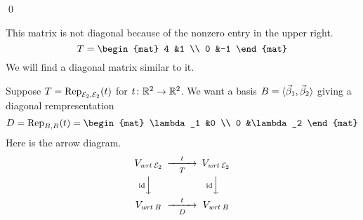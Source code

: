 \documentclass[10pt,t]{beamer}
\begin{document}
\begin{frame}
\lm[lm:DiagIffBasisOfEigens]

\pause
\pf
{}  
\qed
\end{frame}

\begin{frame}
\ex
This matrix is not diagonal because of the nonzero entry in the upper right.
\begin{equation*}
  T=
  \begin{mat}
    4  &1  \\
    0  &-1
  \end{mat}
\end{equation*}
We will find a diagonal matrix similar to it.

\pause
Suppose $T=\rep{t}{\stdbasis_2,\stdbasis_2}$ for $\map{t}{\Re^2}{\Re^2}$.
We want a basis $B=\sequence{\vec{\beta}_1,\vec{\beta}_2}$ giving a 
diagonal rempresentation
\begin{equation*}
  D=\rep{t}{B,B}=
  \begin{mat}
    \lambda_1  &0 \\
    0    &\lambda_2
  \end{mat}
\end{equation*}
Here is the arrow diagram.
\begin{equation*}
  \begin{CD}
    V_{\wrt{\stdbasis_2}}            @>t>T>        V_{\wrt{\stdbasis_2}}       \\
    @V{\scriptstyle\identity} VV              @V{\scriptstyle\identity} VV \\
    V_{\wrt{B}}                   @>t>D>        V_{\wrt{B}}
  \end{CD}
\end{equation*}
\end{frame}
\end{document}
